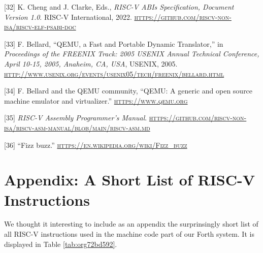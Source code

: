 \documentclass[a4paper,12pt,final]{article}
\begin{document}
\hypertarget{citeproc_bib_item_32}{[32] K. Cheng and J. Clarke, Eds., \textit{RISC-V ABIs Specification, Document Version 1.0}. RISC-V International, 2022. \textsc{\url{https://github.com/riscv-non-isa/riscv-elf-psabi-doc}}}

\hypertarget{citeproc_bib_item_33}{[33] F. Bellard, “QEMU, a Fast and Portable Dynamic Translator,” in \textit{Proceedings of the FREENIX Track: 2005 USENIX Annual Technical Conference, April 10-15, 2005, Anaheim, CA, USA}, USENIX, 2005. \textsc{\url{http://www.usenix.org/events/usenix05/tech/freenix/bellard.html}}}

\hypertarget{citeproc_bib_item_34}{[34] F. Bellard and the QEMU community, “QEMU: A generic and open source machine emulator and virtualizer.” \textsc{\url{https://www.qemu.org}}}

\hypertarget{citeproc_bib_item_35}{[35] \textit{RISC-V Assembly Programmer’s Manual}. \textsc{\url{https://github.com/riscv-non-isa/riscv-asm-manual/blob/main/riscv-asm.md}}}

\hypertarget{citeproc_bib_item_36}{[36] “Fizz buzz.” \textsc{\url{https://en.wikipedia.org/wiki/Fizz_buzz}}}\bigskip
\clearpage
\appendix


\section{Appendix: A Short List of RISC-V Instructions}
\label{sec:org0770758}

We thought it interesting to include as an appendix the surprinsingly
short list of all RISC-V instructions used in the machine code part of
our Forth system.  It is displayed in Table
\ref{tab:org72bd592}.
\end{document}
